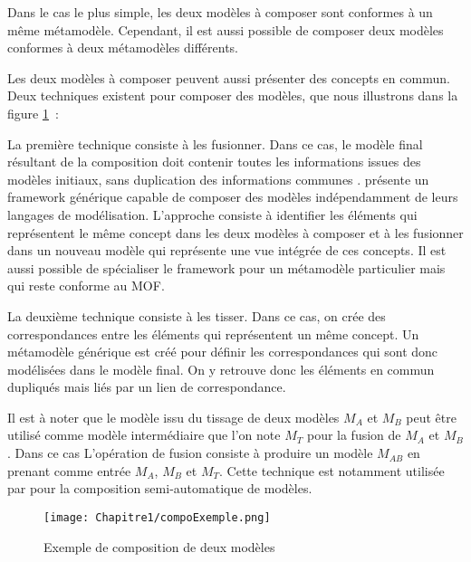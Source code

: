 \begin{description}
Dans le cas le plus simple, les deux modèles à composer sont conformes à un même 
métamodèle. Cependant, il est aussi possible de composer deux modèles conformes 
à deux métamodèles différents. 

Les deux modèles à composer peuvent aussi présenter des concepts en commun. Deux 
techniques existent pour composer des modèles, que nous illustrons dans la 
figure \ref{fig:compoExemple}~:

\begin{bulletList}
\item La première technique consiste à les fusionner. Dans ce cas, le modèle 
final résultant de la composition doit contenir toutes les informations issues 
des modèles initiaux, sans duplication des informations communes 
\cite{bezivin2006canonical}.
\cite{fleurey2008generic} présente un framework générique capable de composer 
des modèles indépendamment de leurs langages de modélisation. L'approche 
consiste à identifier les éléments qui représentent le même concept dans les 
deux modèles à composer et à les fusionner dans un nouveau modèle qui représente 
une vue intégrée de ces concepts. Il est aussi possible de spécialiser le 
framework pour un métamodèle particulier mais qui reste conforme au MOF.

\item La deuxième technique consiste à les tisser. Dans ce cas, on crée des 
correspondances entre les éléments qui représentent un même concept. Un 
métamodèle générique est créé pour définir les correspondances qui sont donc 
modélisées dans le modèle final. On y retrouve donc les éléments en commun 
dupliqués mais liés par un lien de correspondance. 
\end{bulletList}

Il est à noter que le modèle issu du tissage de deux modèles $M_{A}$ et $M_{B}$ 
peut être utilisé comme modèle intermédiaire que l'on note $M_{T}$ pour la 
fusion de $M_{A}$ et $M_{B}$. Dans ce cas L'opération de fusion consiste à 
produire un modèle $M_{AB}$ en prenant comme entrée $M_{A}$, $M_{B}$ et $M_{T}$. 
Cette technique est notamment utilisée par \cite{del2007semi} pour la 
composition semi-automatique de modèles.

\begin{figure}[!htbp]
 \begin{center}
  \texttt{[image: Chapitre1/compoExemple.png]}
 \end{center}
 \caption{Exemple de composition de deux modèles}
 \label{fig:compoExemple}
\end{figure}


\end{description}
